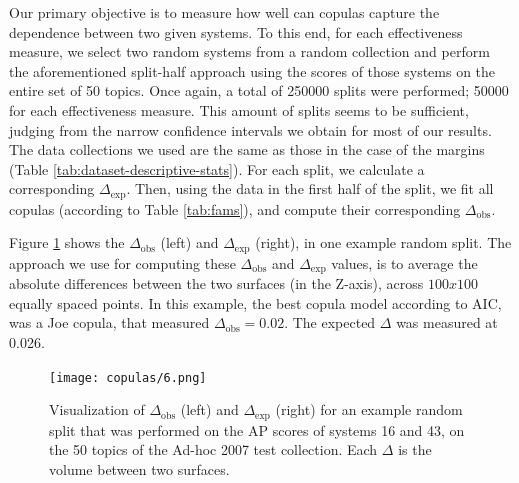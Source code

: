 \clearpage

Our primary objective is to measure how well can copulas capture the dependence between two given systems. To this end, for each effectiveness measure, we select two random systems from a random collection and perform the aforementioned split-half approach using the scores of those systems on the entire set of 50 topics. Once again, a total of \num{250000} splits were performed; \num{50000} for each effectiveness measure. This amount of splits seems to be sufficient, judging from the narrow confidence intervals we obtain for most of our results. The data collections we used are the same as those in the case of the margins (Table \ref{tab:dataset-descriptive-stats}). For each split, we calculate a corresponding $\Delta_\text{exp}$. Then, using the data in the first half of the split, we fit all copulas (according to Table \ref{tab:fams}), and compute their corresponding $\Delta_\text{obs}$. 

Figure \ref{fig:copula-example-split} shows the $\Delta_\text{obs}$ (left) and $\Delta_\text{exp}$ (right), in one example random split. The approach we use for computing these $\Delta_\text{obs}$ and $\Delta_\text{exp}$ values, is to average the absolute differences between the two surfaces (in the Z-axis), across $100x100$ equally spaced points. In this example, the best copula model according to AIC, was a Joe copula, that measured $\Delta_\text{obs}=0.02$. The expected $\Delta$ was measured at 0.026.

\begin{figure}[t]
	\centering
	\texttt{[image: copulas/6.png]}
	\caption{Visualization of $\Delta_{\text{obs}}$ (left) and $\Delta_{\text{exp}}$ (right) for an example random split that was performed on the AP scores of systems 16 and 43, on the 50 topics of the Ad-hoc 2007 test collection. Each $\Delta$ is the volume between two surfaces.}
	\label{fig:copula-example-split}
\end{figure}

